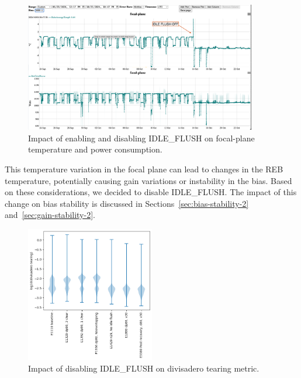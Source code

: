 \begin{figure}[ht]
\begin{centering}
\includegraphics[width=0.9\textwidth]{figures/REB_power_temp6_sept24_to_Oct23.png}
\end{centering}
\caption{Impact of enabling and disabling IDLE\_FLUSH on focal-plane temperature and power consumption.}\label{fig:IdleFlushEffect}
\end{figure}

This temperature variation in the focal plane can lead to changes in the REB temperature, potentially causing gain variations or instability in the bias. Based on these considerations, we decided to disable IDLE\_FLUSH. The impact of this change on bias stability is discussed in Sections~\ref{sec:bias-stability-2} and~\ref{sec:gain-stability-2}.

\begin{figure}[ht]
\begin{centering}
\includegraphics[width=0.5\textwidth]{figures/divisadero.png}
\end{centering}
\caption{Impact of disabling IDLE\_FLUSH on divisadero tearing metric.}\label{IdleFlushEffect:divisadero}
\end{figure}

